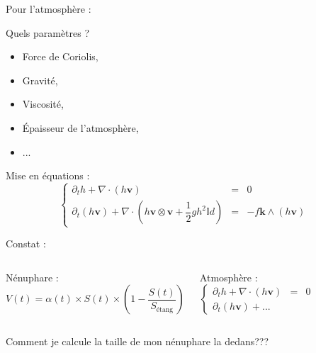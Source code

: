 \documentclass[11pt]{beamer}
\begin{document}
\begin{frame}{Pour l'atmosphère :}

Quels paramètres ?
\begin{itemize}
\item Force de Coriolis,
\item Gravité,
\item Viscosité,
\item \'Epaisseur de l'atmosphère,
\item ...
\end{itemize}

\begin{block}{Mise en équations :}
\begin{equation*}
\left \{
\begin{array}{rcl}
\partial_t h + \nabla \cdot \left( h \mathbf{v} \right) & = & 0 \\
\partial_t ( h \mathbf{v} ) + \nabla \cdot \left( h \mathbf{v} \otimes \mathbf{v} + \dfrac{1}{2} g h^2 \mathbb{I}d \right) & = & - f \mathbf{k} \wedge \left( h \mathbf{v} \right)
\end{array}
\right.
\end{equation*}
\end{block}
\end{frame}


\begin{frame}{Constat :}
\begin{columns}
\begin{block}{Nénuphare : }
$$V(t) = \alpha(t) \times S(t) \times \left( 1 - \dfrac{S(t)}{S_{\text{étang}}} \right)$$
\end{block}


\begin{block}{Atmosphère :}
\begin{equation*}
\left \{
\begin{array}{rcl}
\partial_t h + \nabla \cdot \left( h \mathbf{v} \right) & = & 0 \\
\partial_t ( h \mathbf{v} ) + ... &  & 
\end{array}
\right.
\end{equation*}
\end{block}
\end{columns}

\begin{alertblock}{}
Comment je calcule la taille de mon nénuphare la dedans???
\end{alertblock}

\end{frame}
\end{document}
